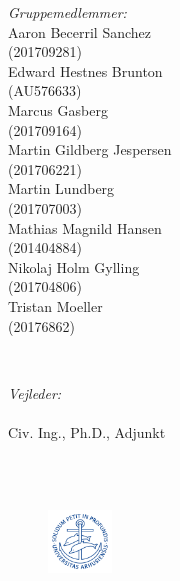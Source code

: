 \begin{titlepage}
\begin{minipage}{0.4\textwidth}
\begin{flushleft} \small
\emph{Gruppemedlemmer:} 
\\Aaron Becerril Sanchez\\ (201709281)
\\Edward Hestnes Brunton\\ (AU576633)
\\Marcus Gasberg\\ (201709164) 
\\Martin Gildberg Jespersen\\ (201706221) 
\\Martin Lundberg\\ (201707003) 
\\Mathias Magnild Hansen\\ (201404884)
\\Nikolaj Holm Gylling\\ (201704806)
\\Tristan Moeller\\ (20176862)
\end{flushleft}
\end{minipage}
~
\begin{minipage}{0.4\textwidth}
\begin{flushright} \small
\emph{Vejleder:} \\
\vejleder \\ Civ. Ing., Ph.D., Adjunkt %
\end{flushright}
\end{minipage}\\[1cm]



{\large \afleveringsdato}\\[1cm] %


\begin{figure}[H]
    \centering
    \includegraphics[width=0.15\textwidth]{Setup/graphics/AU.png}
\end{figure}

\vfill
\end{titlepage}
